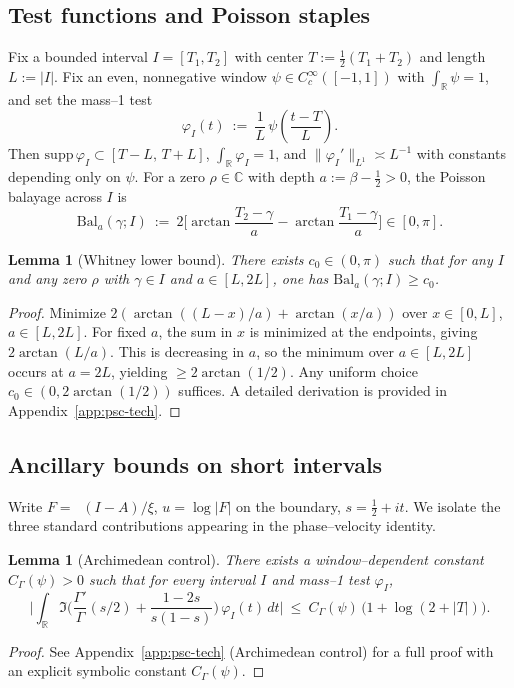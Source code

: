 \documentclass[11pt]{article}
\newtheorem{lemma}[theorem]{Lemma}
\theoremstyle{definition}
\theoremstyle{remark}
\newcommand{\C}{\mathbb{C}}
\newcommand{\R}{\mathbb{R}}
\DeclareMathOperator{\dettwo}{det_2}
\begin{document}
\subsection{Test functions and Poisson staples}
Fix a bounded interval \(I=[T_1,T_2]\) with center \(T:=\tfrac12(T_1+T_2)\) and length \(L:=|I|\). Fix an even, nonnegative window \(\psi\in C_c^\infty([-1,1])\) with \(\int_\R\psi=1\), and set the mass–1 test
\[
  \varphi_I(t)\ :=\ \frac{1}{L}\,\psi\!\left(\frac{t-T}{L}\right).
\]
Then \(\mathrm{supp}\,\varphi_I\subset[T-L,\,T+L]\), \(\int_\R \varphi_I=1\), and \(\|\varphi_I'\|_{L^1}\asymp L^{-1}\) with constants depending only on \(\psi\).
For a zero \(\rho\in\C\) with depth \(a:=\beta-\tfrac12>0\), the Poisson balayage across \(I\) is
\[ \mathrm{Bal}_a(\gamma;I)\ :=\ 2\Big[\arctan\!\frac{T_2-\gamma}{a}-\arctan\!\frac{T_1-\gamma}{a}\Big] \in [0,\pi].\]
\begin{lemma}[Whitney lower bound]\label{lem:whitney-lower}
There exists \(c_0\in(0,\pi)\) such that for any \(I\) and any zero \(\rho\) with \(\gamma\in I\) and \(a\in[L,2L]\), one has \(\mathrm{Bal}_a(\gamma;I)\ge c_0\).
\end{lemma}
\begin{proof}
Minimize \(2(\arctan((L-x)/a)+\arctan(x/a))\) over \(x\in[0,L]\), \(a\in[L,2L]\). For fixed \(a\), the sum in \(x\) is minimized at the endpoints, giving \(2\arctan(L/a)\). This is decreasing in \(a\), so the minimum over \(a\in[L,2L]\) occurs at \(a=2L\), yielding \(\ge 2\arctan(1/2)\). Any uniform choice \(c_0\in(0,2\arctan(1/2))\) suffices. A detailed derivation is provided in Appendix~\ref{app:psc-tech}.
\end{proof}

\subsection{Ancillary bounds on short intervals}
Write \(F=\dettwo(I-A)/\xi\), \(u=\log|F|\) on the boundary, \(s=\tfrac12+it\). We isolate the three standard contributions appearing in the phase--velocity identity.
\begin{lemma}[Archimedean control]\label{lem:arch}
There exists a window–dependent constant \(C_\Gamma(\psi)>0\) such that for every interval \(I\) and mass–1 test \(\varphi_I\),
\[ \Big|\int_{\R} \Im\Big(\frac{\Gamma'}{\Gamma}(s/2)+\frac{1-2s}{s(1-s)}\Big)\,\varphi_I(t)\,dt\Big|\ \le\ C_\Gamma(\psi)\,\big(1+\log(2+|T|)\big).\]
\end{lemma}
\begin{proof}
See Appendix~\ref{app:psc-tech} (Archimedean control) for a full proof with an explicit symbolic constant \(C_\Gamma(\psi)\).
\end{proof}
\end{document}
